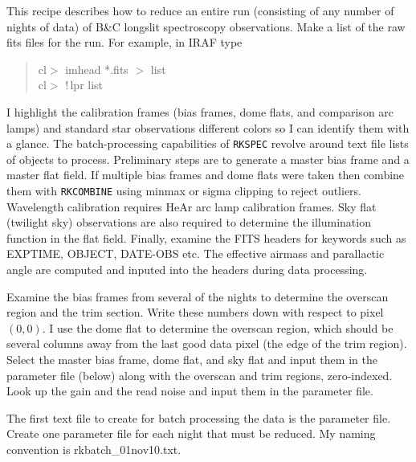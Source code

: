 \documentclass[12pt,preprint]{aastex}
\begin{document}
This recipe describes how to reduce an entire run (consisting of any
number of nights of data) of B\&C longslit spectroscopy observations.
Make a list of the raw fits files for the run.  For example, in IRAF
type

\begin{quote}
cl$>$ imhead *.fits $>$ list \\
cl$>$ !\,lpr list
\end{quote}

\noindent I highlight the calibration frames (bias frames, dome flats,
and comparison arc lamps) and standard star observations different
colors so I can identify them with a glance.  The batch-processing
capabilities of {\tt RKSPEC} revolve around text file lists of objects
to process.  Preliminary steps are to generate a master bias frame and
a master flat field.  If multiple bias frames and dome flats were
taken then combine them with {\tt RKCOMBINE} using minmax or sigma
clipping to reject outliers.  Wavelength calibration requires HeAr arc
lamp calibration frames.  Sky flat (twilight sky) observations are
also required to determine the illumination function in the flat
field.  Finally, examine the FITS headers for keywords such as
EXPTIME, OBJECT, DATE-OBS etc.  The effective airmass and parallactic
angle are computed and inputed into the headers during data
processing.

Examine the bias frames from several of the nights to determine the
overscan region and the trim section.  Write these numbers down with
respect to pixel $(0,0)$.  I use the dome flat to determine the
overscan region, which should be several columns away from the last
good data pixel (the edge of the trim region).  Select the master bias
frame, dome flat, and sky flat and input them in the parameter file
(below) along with the overscan and trim regions, zero-indexed.  Look
up the gain and the read noise and input them in the parameter file.

The first text file to create for batch processing the data is the
parameter file.  Create one parameter file for each night that must be
reduced.  My naming convention is rkbatch\_01nov10.txt.
\end{document}
